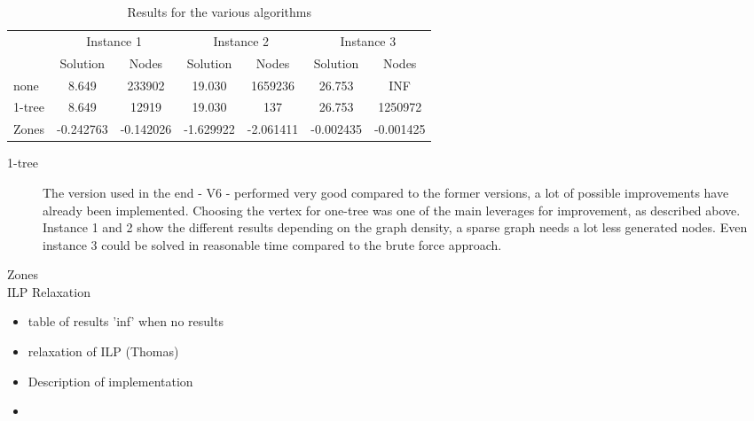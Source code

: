 \documentclass{article}
\begin{document}
\begin{table}[h!]
  \centering
  \begin{tabular}{l|c|c|c|c|c|c}
    & \multicolumn{2}{c|}{Instance 1} & \multicolumn{2}{|c|}{Instance 2} & \multicolumn{2}{|c}{Instance 3} \\
    & Solution & Nodes &  Solution & Nodes & Solution & Nodes \\
    \hline
    none & 8.649 & 233902 &  19.030 & 1659236  & 26.753 & INF \\ 
    1-tree & 8.649 & 12919 &  19.030 & 137 & 26.753 & 1250972 \\ 
    Zones & -0.242763 & -0.142026 & -1.629922 & -2.061411 & -0.002435 & -0.001425 \\
  \end{tabular}
  \caption{Results for the various algorithms}
  \label{tab:results}
\end{table}

\begin{description}
\item[1-tree] The version used in the end - V6 - performed very good compared to the former versions, a lot of possible improvements have already been implemented. Choosing the vertex for one-tree was one of the main leverages for improvement, as described above. Instance 1 and 2 show the different results depending on the graph density, a sparse graph needs a lot less generated nodes. Even instance 3 could be solved in reasonable time compared to the brute force approach.
\item[Zones]
\item[ILP Relaxation]
\end{description}

\begin{itemize}
\item table of results 'inf' when no results
\item relaxation of ILP (Thomas)
\item Description of implementation
\item 
\end{itemize}
\end{document}
